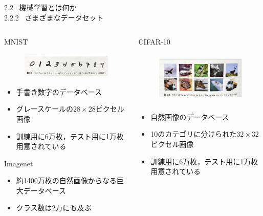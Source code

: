 \documentclass[dvipdfmx,10pt]{beamer}
\begin{document}
  \begin{frame}[t]{2.2 \ 機械学習とは何か \\ \normalsize{2.2.2 \ さまざまなデータセット}}
    \begin{columns}
      \begin{column}{0.5\textwidth}
        MNIST
        \begin{figure}
          \begin{center}
            \includegraphics[height=1.2cm]{./MNIST.jpeg}
          \end{center}   
        \end{figure}
        \begin{itemize}
          \item 手書き数字のデータベース
          \item グレースケールの$28 \times 28$ピクセル画像
          \item 訓練用に6万枚，テスト用に1万枚用意されている
        \end{itemize}
        Imagenet
        \begin{itemize}
          \item 約1400万枚の自然画像からなる巨大データベース
          \item クラス数は2万にも及ぶ
        \end{itemize}
      \end{column}
      \begin{column}{0.5\textwidth}
        CIFAR-10
        \begin{figure}
          \begin{center}
            \includegraphics[height=2.5cm]{./CIFAR10.jpeg}
          \end{center}   
        \end{figure}
        \begin{itemize}
          \item 自然画像のデータベース
          \item 10のカテゴリに分けられた$32 \times 32$ピクセル画像
          \item 訓練用に6万枚，テスト用に1万枚用意されている
        \end{itemize}
      \end{column}
    \end{columns}
  \end{frame}
\end{document}

